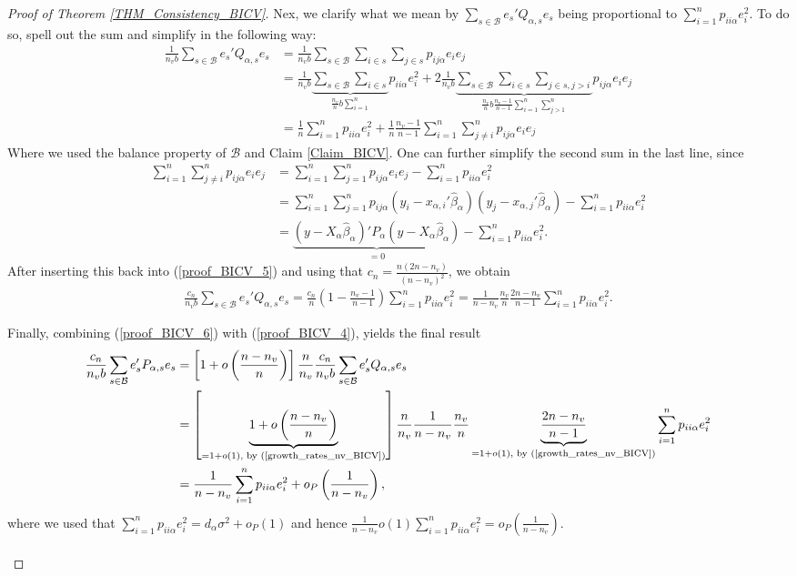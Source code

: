 \documentclass[Research_Module_ES.tex]{subfiles}
\begin{document}
\begin{proof}[Proof of Theorem \ref{THM_Consistency_BICV}]
	Nex, we clarify what we mean by $\sum_{s\in \mathcal{B}}e_s'Q_{\alpha,s}e_s$ being proportional to $\sum_{i=1}^np_{ii\alpha}e_i^2$. To do so, spell out the sum and simplify in the following way:
	\begin{align}
	\frac{1}{n_vb}\sum_{s\in \mathcal{B}}e_s'Q_{\alpha,s}e_s
	&= \frac{1}{n_vb}\sum_{s\in \mathcal{B}}\sum_{i\in s}\sum_{j\in s}p_{ij\alpha}e_ie_j\nonumber\\
	&=\frac{1}{n_vb}\underbrace{\sum_{s\in \mathcal{B}} \sum_{i\in s}}_{\frac{n_v}{n}b\sum_{i=1}^n} p_{ii\alpha}e_i^2 
	+ 2\frac{1}{n_vb}\underbrace{\sum_{s\in \mathcal{B}} \sum_{i\in s}\sum_{j\in s, j>i }}_{\frac{n_v}{n}
	b\frac{n_v-1}{n-1}\sum_{i=1}^n\sum_{j>1}^n} p_{ij\alpha}e_ie_j\nonumber\\
	&=\frac{1}{n}\sum_{i=1}^np_{ii\alpha}e_i^2 + \frac{1}{n}\frac{n_v-1}{n-1}\sum_{i=1}^n\sum_{j\neq i}^np_{ij\alpha}e_ie_j\label{proof_BICV_5}
	\end{align}
	Where we used the balance property of $\mathcal{B}$ and Claim \ref{Claim_BICV}. 
	One can further simplify the second sum in the last line, since
	\begin{align*}
	\sum_{i=1}^n\sum_{j\neq i}^np_{ij\alpha}e_ie_j 
	&= \sum_{i=1}^n\sum_{j=1}^np_{ij\alpha}e_ie_j - \sum_{i=1}^np_{ii\alpha}e_i^2\\
	&= \sum_{i=1}^n\sum_{j=1}^np_{ij\alpha}(y_i-x_{\alpha,i}'\hat{\beta}_\alpha)(y_j-x_{\alpha,j}'\hat{\beta}_\alpha) - \sum_{i=1}^np_{ii\alpha}e_i^2\\
	&=\underbrace{(y-X_\alpha\hat{\beta}_\alpha)'P_\alpha(y-X_\alpha\hat{\beta}_\alpha)}_{=0} - \sum_{i=1}^np_{ii\alpha}e_i^2.
	\end{align*}
	After inserting this back into (\ref{proof_BICV_5}) and using that $c_n=\frac{n(2n-n_v)}{(n-n_v)^2}$, we obtain
	\begin{align}
	\frac{c_n}{n_vb}\sum_{s\in \mathcal{B}}e_s'Q_{\alpha,s}e_s 
	= \frac{c_n}{n}\left(1-\frac{n_v-1}{n-1}\right)\sum_{i=1}^np_{ii\alpha}e_i^2
	= \frac{1}{n-n_v}\frac{n_v}{n}\frac{2n-n_v}{n-1}\sum_{i=1}^np_{ii\alpha}e_i^2.\label{proof_BICV_6}
	\end{align}
	
	Finally, combining (\ref{proof_BICV_6}) with (\ref{proof_BICV_4}), yields the final result
	\begin{align*}
	\frac{c_n}{n_vb}\sum_{s\in \mathcal{B}}e_s'P_{\alpha,s}e_s
	&=\left[1+o\left(\frac{n-n_v}{n}\right)\right]\frac{n}{n_v}\frac{c_n}{n_vb}\sum_{s\in \mathcal{B}}e_s'Q_{\alpha,s}e_s\\
	&=\left[\underbrace{1+o\left(\frac{n-n_v}{n}\right)}_{=1+o(1)\textrm{, by (\ref{growth_rates_nv_BICV})}}\right]\frac{n}{n_v}\frac{1}{n-n_v}\frac{n_v}{n}\underbrace{\frac{2n-n_v}{n-1}}_{=1+o(1)\textrm{, by (\ref{growth_rates_nv_BICV})}}\sum_{i=1}^np_{ii\alpha}e_i^2\\
	&=\frac{1}{n-n_v}\sum_{i=1}^np_{ii\alpha}e_i^2 + o_P\left(\frac{1}{n-n_v}\right),
	\end{align*}
	where we used that $\sum_{i=1}^np_{ii\alpha}e_i^2=d_\alpha\sigma^2+o_P(1)$ and hence $\frac{1}{n-n_v}o(1)\sum_{i=1}^np_{ii\alpha}e_i^2=o_P(\frac{1}{n-n_v})$.\\\\
	

\end{proof}
\end{document}
